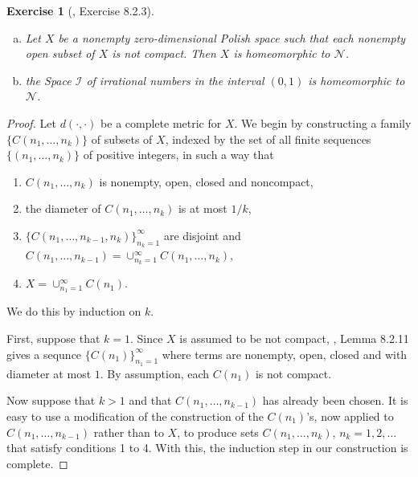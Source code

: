 \documentclass[11pt]{article}
\theoremstyle{plain}
\newtheorem{exercise}{Exercise}
\theoremstyle{definition}
\theoremstyle{remark}
\begin{document}
\begin{exercise}[\cite{book:992991}, Exercise 8.2.3]\
    \begin{enumerate}[(a)]
        \item 
     Let $X$ be a nonempty zero-dimensional Polish space such that each nonempty open subset of $X$ is not compact.
    Then $X$ is homeomorphic to $\mathscr N$.
\item
    the Space $\mathscr I$ of irrational numbers in the interval $(0,1)$ is homeomorphic to $\mathscr N$. 
    \end{enumerate}
    \label{CohnEx8.2.3}
\end{exercise}
\begin{proof}
    Let $d(\cdot, \cdot)$ be a complete metric for $X$.
    We begin by constructing a family $\{C(n_1,\dots,n_k)\}$ of subsets of $X$, indexed by the set of all finite sequences $\{(n_1,\dots,n_k)\}$ of positive integers, in such a way that
    \begin{enumerate}[1.]
        \item 
            $C(n_1,\dots,n_k)$ is nonempty, open, closed and noncompact,
        \item
            the diameter of $C(n_1,\dots,n_k)$ is at most $1/k$,
        \item
            $\{C(n_1,\dots,n_{k-1},n_k)\}_{n_k=1}^\infty$ are disjoint
            and
            $C(n_1,\dots,n_{k-1})=\cup_{n_k=1}^\infty C(n_1,\dots,n_k)$,
        \item
            $X=\cup_{n_1=1}^\infty C(n_1)$.
    \end{enumerate}
    We do this by induction on $k$.

    First, suppose that $k=1$.
    Since $X$ is assumed to be not compact, \cite{book:992991}, Lemma 8.2.11 gives a sequnce $\{C(n_1)\}_{n_1=1}^\infty$ where terms are nonempty, open, closed and with diameter at most $1$.
    By assumption, each $C(n_1)$ is not compact.

    Now suppose that $k>1$ and that $C(n_1,\dots,n_{k-1})$ has already been chosen. 
    It is easy to use a modification of the construction of the $C(n_1)$'s, now applied to $C(n_1,\dots,n_{k-1})$ rather than to $X$, to produce sets $C(n_1,\dots,n_k)$, $n_k=1,2,\dots$ that satisfy conditions 1 to 4.
    With this, the induction step in our construction is complete.
    

\end{proof}
\end{document}
